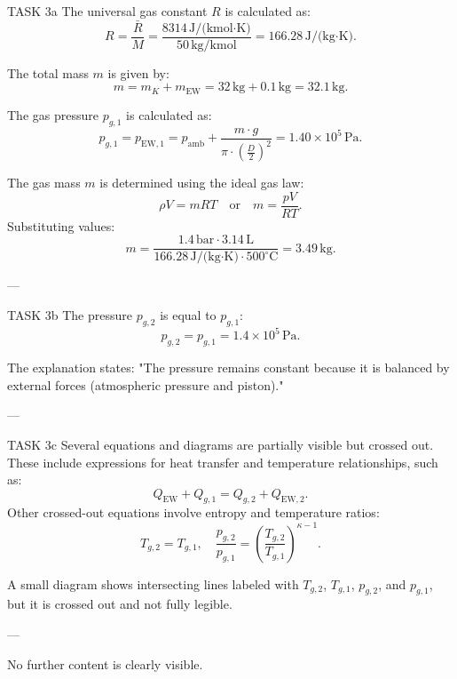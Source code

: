 TASK 3a  
The universal gas constant \( R \) is calculated as:  
\[
R = \frac{\bar{R}}{M} = \frac{8314 \, \text{J/(kmol·K)}}{50 \, \text{kg/kmol}} = 166.28 \, \text{J/(kg·K)}.
\]  

The total mass \( m \) is given by:  
\[
m = m_K + m_{\text{EW}} = 32 \, \text{kg} + 0.1 \, \text{kg} = 32.1 \, \text{kg}.
\]  

The gas pressure \( p_{g,1} \) is calculated as:  
\[
p_{g,1} = p_{\text{EW},1} = p_{\text{amb}} + \frac{m \cdot g}{\pi \cdot \left(\frac{D}{2}\right)^2} = 1.40 \times 10^5 \, \text{Pa}.
\]  

The gas mass \( m \) is determined using the ideal gas law:  
\[
\rho V = mRT \quad \text{or} \quad m = \frac{pV}{RT}.
\]  
Substituting values:  
\[
m = \frac{1.4 \, \text{bar} \cdot 3.14 \, \text{L}}{166.28 \, \text{J/(kg·K)} \cdot 500^\circ\text{C}} = 3.49 \, \text{kg}.
\]  

---

TASK 3b  
The pressure \( p_{g,2} \) is equal to \( p_{g,1} \):  
\[
p_{g,2} = p_{g,1} = 1.4 \times 10^5 \, \text{Pa}.
\]  

The explanation states:  
"The pressure remains constant because it is balanced by external forces (atmospheric pressure and piston)."

---

TASK 3c  
Several equations and diagrams are partially visible but crossed out. These include expressions for heat transfer and temperature relationships, such as:  
\[
Q_{\text{EW}} + Q_{g,1} = Q_{g,2} + Q_{\text{EW},2}.
\]  
Other crossed-out equations involve entropy and temperature ratios:  
\[
T_{g,2} = T_{g,1}, \quad \frac{p_{g,2}}{p_{g,1}} = \left(\frac{T_{g,2}}{T_{g,1}}\right)^{\kappa - 1}.
\]  

A small diagram shows intersecting lines labeled with \( T_{g,2} \), \( T_{g,1} \), \( p_{g,2} \), and \( p_{g,1} \), but it is crossed out and not fully legible.  

---

No further content is clearly visible.